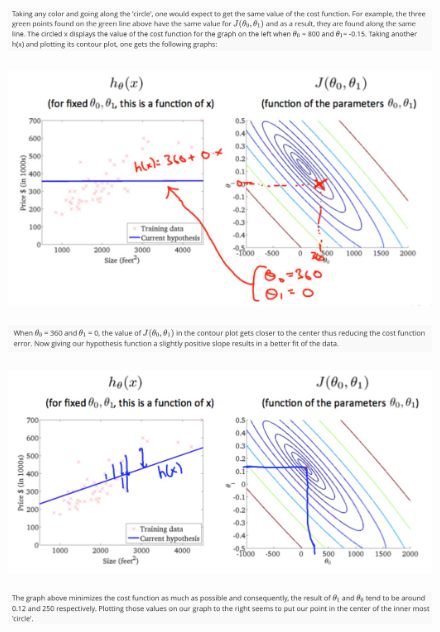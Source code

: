 \documentclass[12pt, A4,onecolumn]{article} %
\begin{document}
\begin{figure}[H]
	\centering
	\includegraphics[width=1\textwidth]{./Imagenes/costFunc10}
\end{figure}	

\begin{figure}[H]
	\centering
	\includegraphics[width=1\textwidth]{./Imagenes/costFunc11}
\end{figure}	

\begin{figure}[H]
	\centering
	\includegraphics[width=1\textwidth]{./Imagenes/costFunc12}
\end{figure}

\begin{figure}[H]
	\centering
	\includegraphics[width=1\textwidth]{./Imagenes/costFunc13}
\end{figure}

\begin{figure}[H]
	\centering
	\includegraphics[width=1\textwidth]{./Imagenes/costFunc14}
\end{figure}
\end{document}
